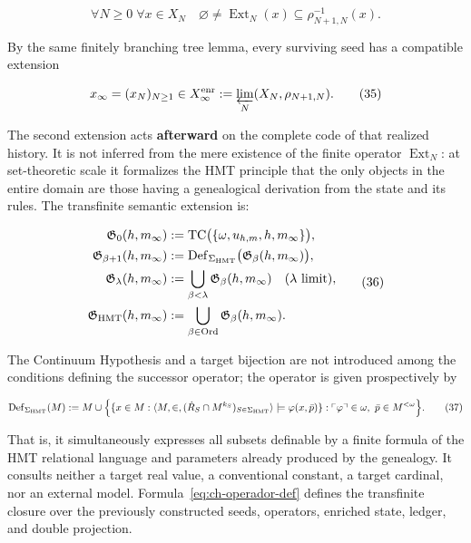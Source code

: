 \[
 \forall N\ge0\;\forall x\in X_N\quad
 \varnothing\ne\operatorname{Ext}_N(x)
 \subseteq\rho_{N+1,N}^{-1}(x).
\tag{34}\label{eq:ch-extension-no-vacia}
\]

By the same finitely branching tree lemma, every surviving seed has a
compatible extension

\[
 x_\infty=(x_N)_{N\ge1}\in
 X_\infty^{\rm enr}:=\varprojlim_N(X_N,\rho_{N+1,N}).
\tag{35}\label{eq:ch-limite-inverso}
\]

The second extension acts \textbf{afterward} on the complete code of that
realized history. It is not inferred from the mere existence of the finite
operator \(\operatorname{Ext}_N\): at set-theoretic scale it formalizes the
HMT principle that the only objects in the entire domain are those having a
genealogical derivation from the state and its rules. The transfinite semantic
extension is:

\[
 \begin{aligned}
  \mathfrak G_0(h,m_\infty)
  &:=\operatorname{TC}\bigl(\{\omega,u_{h,m},h,m_\infty\}\bigr),\\
  \mathfrak G_{\beta+1}(h,m_\infty)
  &:=\operatorname{Def}_{\Sigma_{\rm HMT}}
       \bigl(\mathfrak G_\beta(h,m_\infty)\bigr),\\
  \mathfrak G_\lambda(h,m_\infty)
  &:=\bigcup_{\beta<\lambda}\mathfrak G_\beta(h,m_\infty)
       \quad(\lambda\text{ limit}),\\
  \mathfrak G_{\rm HMT}(h,m_\infty)
  &:=\bigcup_{\beta\in\operatorname{Ord}}
       \mathfrak G_\beta(h,m_\infty).
 \end{aligned}
\tag{36}\label{eq:ch-clausura-transfinita}
\]

The Continuum Hypothesis and a target bijection are not introduced among the
conditions defining the successor operator; the operator is given
prospectively by

\[
 \operatorname{Def}_{\Sigma_{\rm HMT}}(M)
 :=M\cup
 \Bigl\{
   \{x\in M:\langle M,\in,
       (\dot R_S\cap M^{k_S})_{S\in\Sigma_{\rm HMT}}\rangle
       \models\varphi(x,\bar p)\}:
   \ulcorner\varphi\urcorner\in\omega,
   \ \bar p\in M^{<\omega}
 \Bigr\}.
\tag{37}\label{eq:ch-operador-def}
\]

That is, it simultaneously expresses all subsets definable by a finite formula
of the HMT relational language and parameters already produced by the
genealogy. It consults neither a target real value, a conventional constant, a
target cardinal, nor an external model. Formula~\eqref{eq:ch-operador-def}
defines the transfinite closure over the previously constructed seeds,
operators, enriched state, ledger, and double projection.

